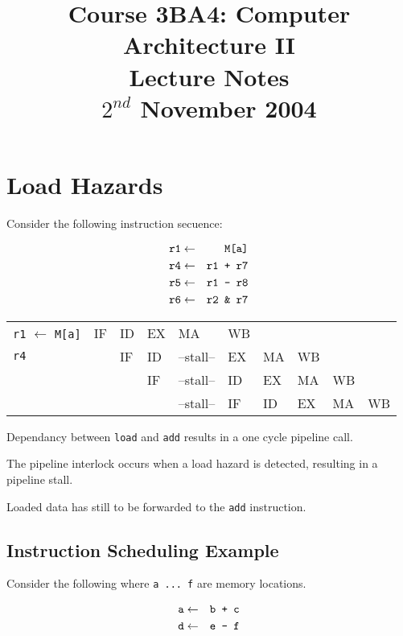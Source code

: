 \documentclass[a4paper,12pt]{article}
\begin{document}
\title{Course 3BA4: Computer Architecture II \\ Lecture Notes \\ $2^{nd}$ November 2004}

\maketitle

\section*{Load Hazards}

Consider the following instruction secuence:

\begin{eqnarray*}
\verb!r1! 	& 	\leftarrow 	&	\verb!M[a]! 	\\
\verb!r4! 	& 	\leftarrow	&	\verb!r1 + r7! \\
\verb!r5!	&	\leftarrow	&	\verb!r1 - r8! \\
\verb!r6!	&	\leftarrow	&	\verb!r2 & r7!	\\
\end{eqnarray*}

\begin{tabular}{l|l|l|l|l|l|l|l|l|l}
\verb!r1! $\leftarrow$ \verb!M[a]!	& IF	& ID	& EX	& MA			& WB	& 		&		&		&	\\
\verb!r4!									&		& IF	& ID	& --stall--	& EX	& MA	& WB	&		&	\\
												&		&		& IF	& --stall-- & ID	& EX	& MA	& WB	&	\\
												&		&		&		& --stall--	& IF	& ID	& EX	& MA	& WB \\
\end{tabular}

Dependancy between \verb!load! and \verb!add! results in a one cycle
pipeline call.


The pipeline interlock occurs when a load hazard is detected, resulting
in a pipeline stall.

Loaded data has still to be forwarded to the \verb!add! instruction.


\subsection*{Instruction Scheduling Example}

Consider the following where \verb!a ... f! are memory locations.

\begin{eqnarray*}
\verb!a!	& 	\leftarrow 	&	\verb!b + c! \\
\verb!d! &	\leftarrow	&	\verb!e - f! \\
\end{eqnarray*}
\end{document}
